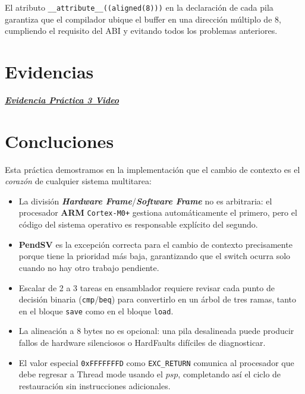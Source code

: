 \documentclass[12pt,letterpaper]{article}
\begin{document}
El atributo \texttt{\_\_attribute\_\_((aligned(8)))} en la declaración de cada pila garantiza que el compilador ubique el buffer en una dirección múltiplo de 8, cumpliendo el requisito del ABI y evitando todos los problemas anteriores.

\bigskip
\bigskip

\section*{Evidencias}

\href{https://drive.google.com/file/d/132fOvRoadHz8GxMy366AXpoB4ttFs6qn/view?usp=drivesdk}
     {\textbf{\textit{\textcolor{linkblue}{Evidencia Práctica 3 Video}}}}

\newpage

\section*{Concluciones}

Esta práctica demostramos en la implementación que el cambio de contexto es el \textit{corazón} de cualquier sistema multitarea:

\begin{itemize}
\item La división \textbf{\textit{Hardware Frame}}/\textbf{\textit{Software Frame}} no es arbitraria: el procesador \textbf{ARM} \texttt{Cortex-M0+} gestiona automáticamente el primero, pero el código del sistema operativo es responsable explícito del segundo.
  
\item \textbf{PendSV} es la excepción correcta para el cambio de contexto precisamente porque tiene la prioridad más baja, garantizando que el switch ocurra solo cuando no hay otro trabajo pendiente.
  
\item  Escalar de 2 a 3 tareas en ensamblador requiere revisar cada punto de decisión binaria (\texttt{cmp}/\texttt{beq}) para convertirlo en un árbol de tres ramas, tanto en el bloque \texttt{save} como en el bloque \texttt{load}.
  
\item  La alineación a 8 bytes no es opcional: una pila desalineada puede producir fallos de hardware silenciosos o HardFaults difíciles de diagnosticar.
  
\item  El valor especial \texttt{0xFFFFFFFD} como \texttt{EXC\_RETURN} comunica al procesador que debe regresar a Thread mode usando el $psp$, completando así el ciclo de restauración sin instrucciones adicionales.
\end{itemize}
\end{document}
